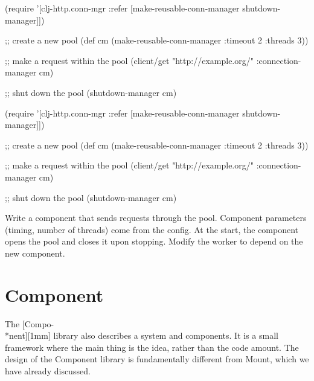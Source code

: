 \ifnarrow

\begin{english}
  \begin{clojure}
(require
 '[clj-http.conn-mgr :refer
   [make-reusable-conn-manager
    shutdown-manager]])

;; create a new pool
(def cm (make-reusable-conn-manager
         {:timeout 2 :threads 3}))

;; make a request within the pool
(client/get "http://example.org/"
            {:connection-manager cm})

;; shut down the pool
(shutdown-manager cm)
  \end{clojure}
\end{english}

\else

\begin{english}
  \begin{clojure}
(require
 '[clj-http.conn-mgr :refer
   [make-reusable-conn-manager
    shutdown-manager]])

;; create a new pool
(def cm (make-reusable-conn-manager
         {:timeout 2 :threads 3}))

;; make a request within the pool
(client/get "http://example.org/"
            {:connection-manager cm})

;; shut down the pool
(shutdown-manager cm)
  \end{clojure}
\end{english}

\fi


Write a component that sends requests through the pool. Component parameters (timing, number of threads) come from the config. At the start, the component opens the pool and closes it upon stopping. Modify the worker to depend on the new component.

\section{Component}


The [Compo-\\*nent][1mm] library also describes a system and components. It is a small framework where the main thing is the idea, rather than the code amount. The design of the Component library is fundamentally different from Mount, which we have already discussed.

